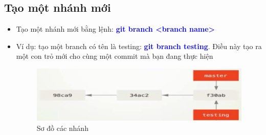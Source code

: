 \documentclass[12pt,a4paper]{report}
\begin{document}
\subsection{Tạo một nhánh mới}
\begin{itemize}
\item Tạo một nhánh mới bằng lệnh: \textcolor{blue}{\bf git branch <branch name>}
\item Ví dụ: tạo một branch có tên là testing: \textcolor{blue}{\bf git branch testing}. Điều này tạo ra một con trỏ mới cho cùng một commit mà bạn đang thực hiện

\begin{figure}[!ht]
	\centering
	\includegraphics[width=0.8\linewidth]{screenshot051}
\caption{Sơ đồ các nhánh}
	\label{fig:screenshot051}
\end{figure}

\end{itemize}
\end{document}
